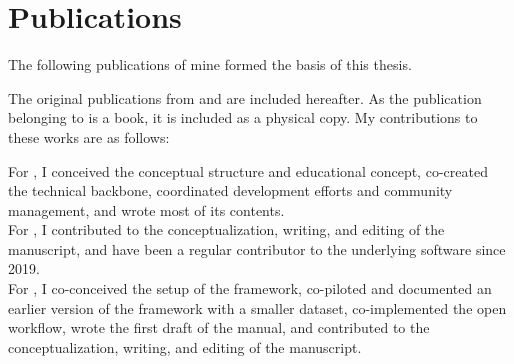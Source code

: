 
\chapter{Publications}

The following publications of mine formed the basis of this thesis.



\begin{refsection}
\nocite{Halchenko2021, wagner2020datalad, wagner2022fairly}
\begin{refcontext}[sorting=nyt]  
	\printbibliography[heading=none, resetnumbers=true]
\end{refcontext}

The original publications from \citet{Halchenko2021} and \citet{wagner2022fairly} are included hereafter.
As the publication belonging to \citet{wagner2020datalad} is a book, it is included as a physical copy.
My contributions to these works are as follows:

For \citet{wagner2020datalad}, I conceived the conceptual structure and educational concept, co-created the technical backbone, coordinated development efforts and community management, and wrote most of its contents.\\
For \citet{Halchenko2021}, I contributed to the conceptualization, writing, and editing of the manuscript, and have been a regular contributor to the underlying software since 2019.\\
For \citet{wagner2022fairly}, I co-conceived the setup of the framework, co-piloted and documented an earlier version of the framework with a smaller dataset, co-implemented the open workflow, wrote the first draft of the manual, and contributed to the conceptualization, writing, and editing of the manuscript.



\end{refsection}
